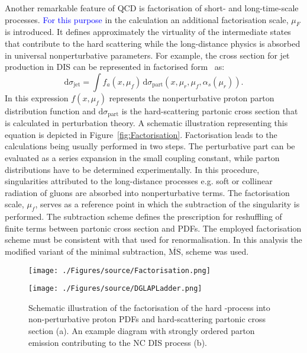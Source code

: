 Another remarkable feature of QCD is factorisation of short- and long-time-scale processes. \textcolor{blue}{For this purpose} in the calculation an additional factorisation scale, $\mu_F$ is introduced. It defines approximately the virtuality of the intermediate states that contribute to the hard scattering while the long-distance physics is absorbed in universal nonperturbative parameters. For example, the cross section for jet production in DIS can be represented in factorised form~\cite{Collins:1989gx} as:
\begin{equation}
 \mathrm{d}\sigma_{\mathrm{jet}} = \int{f_a\left(x,\mu_f\right)}\, \mathrm{d}\sigma_{\mathrm{part}}\left(x,\mu_r, \mu_f, \alpha_s\left(\mu_r\right) \right).
\label{eq:disfactorisation}
\end{equation} 
In this expression $f\left(x,\mu_f\right)$ represents the nonperturbative proton parton distribution function and $\mathrm{d}\sigma_{\mathrm{part}}$ is the hard-scattering partonic cross section that is calculated in perturbation theory. A schematic illustration representing this equation is depicted in Figure~\ref{fig:Factorisation}. Factorisation leads to the calculations being usually performed in two steps. The perturbative part can be evaluated as a series expansion in the small coupling constant, while parton distributions have to be determined experimentally. In this procedure, singularities attributed to the long-distance processes e.g. soft or collinear radiation of gluons are absorbed into nonperturbative terms. The factorisation scale, $\mu_f$, serves as a reference point in which the subtraction of the singularity is performed. The subtraction scheme defines the prescription for reshuffling of finite terms between partonic cross section and PDFs. The employed factorisation scheme must be consistent with that used for renormalisation. In this analysis the modified variant of the minimal subtraction, $\overline{\mathrm{MS}}$, scheme was used.
\begin{figure}[t]
	\centering
	\begin{subfloat}[]{
		\texttt{[image: ./Figures/source/Factorisation.png]}
		\label{fig:Factorisation}
	 }%
	\end{subfloat}
	\begin{subfloat}[]{
		\texttt{[image: ./Figures/source/DGLAPLadder.png]}
		\label{fig:DGLAPLadder}
	}%
	\end{subfloat}
	\caption{Schematic illustration of the factorisation of the hard \ep-process into non-perturbative proton PDFs and hard-scattering partonic cross section (a). An example diagram with strongly ordered parton emission contributing to the NC DIS process (b).}
	\label{fig:factorisationdglapladder}
\end{figure}
